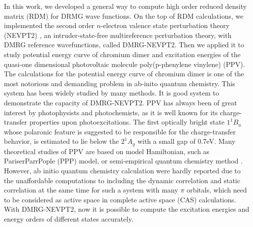 In this work, we developed a general way to compute high order reduced density matrix (RDM) for DRMG wave functions. 
On the top of RDM calculations, we implemented the second order $n$-electron valence state perturbation theory (NEVPT2)
\cite{angeli_introduction_2001,angeli_n-electron_2001, angeli_n-electron_2002}, an intruder-state-free multireference perturbation theory, with DMRG reference wavefunctions, called DMRG-NEVPT2.
Then we applied it to study potential energy curve of chromium dimer and excitation energies of the quasi-one dimensional  photovoltaic molecule poly(p-phenylene vinylene) (PPV). 
The calculations for the potential energy curve of chromium dimer is one of the most notorious and demanding problem in ab-inito quantum chemistry. This system has been widely studied by many methods\cite{roos_ground_2003,celani_cipt2_2004,angeli_third-order_2006,muller_large-scale_2009,kurashige_second-order_2011,ruiperez_complete_2011,kurashige_multireference_2014,sharma_multireference_2015}. It is good system to demonstrate the capacity of DMRG-NEVPT2. 
PPV has always been of great interest by photophysists and photochemists, as it is well known for its charge-transfer properties upon photoexcitations\cite{burroughes_light-emitting_1990,friend_electroluminescence_1999}. The first optically bright state $1^{1}B_{u}$ whose polaronic feature is suggested to be 
responsible for the charge-transfer behavior, is estimated to lie below the $2^{1}A_{g}$ with a small gap of 0.7eV\cite{martin_linear_1999}. 
Many theoretical studies of PPV are based on model Hamiltonian, such as  Pariser\textendash Parr\textendash Pople (PPP) model, \cite{shukla_correlated_2002, bursill_symmetry-adapted_2009} or semi-empirical quantum chemistry method \cite{beljonne_theoretical_1995}. However, ab initio quantum chemistry calculation were hardly reported due to the unaffordable computations to including the dynamic correlation and static correlation at the same time for such a system with many $\pi$ orbitals, which need to be considered as active space in complete active space (CAS) calculations.
With DMRG-NEVPT2, now it is possible to compute the excitation energies and energy orders of different states accurately.

